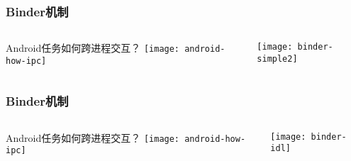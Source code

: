 \begin{frame}[fragile]
	\frametitle{Binder机制}
	
	\begin{columns}
		\begin{column}{.5\textwidth}
			Android任务如何跨进程交互？
			\texttt{[image: android-how-ipc]}
			
		\end{column}
		\begin{column}{.5\textwidth}
			
			\texttt{[image: binder-simple2]}
			
		\end{column}
	\end{columns}
\end{frame}


\begin{frame}[fragile]
	\frametitle{Binder机制}
	
	\begin{columns}
		\begin{column}{.5\textwidth}
			Android任务如何跨进程交互？
			\texttt{[image: android-how-ipc]}
			
		\end{column}
		\begin{column}{.5\textwidth}
			
			\texttt{[image: binder-idl]}
			
		\end{column}
	\end{columns}
\end{frame}

